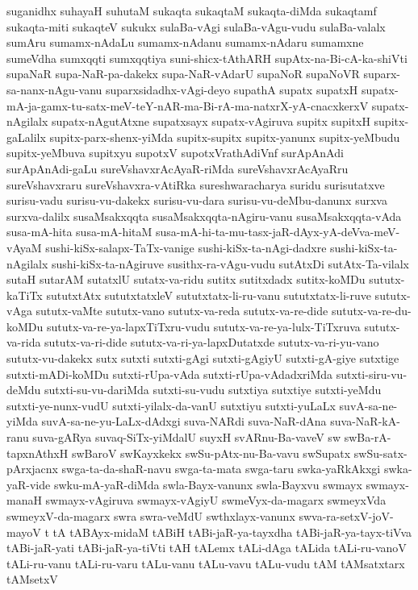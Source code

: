 {suganidhx
suhayaH
suhutaM
sukaqta
sukaqtaM
sukaqta-diMda
sukaqtamf
sukaqta-miti
sukaqteV
sukukx
sulaBa-vAgi
sulaBa-vAgu-vudu
sulaBa-valalx
sumAru
sumamx-nAdaLu
sumamx-nAdanu
sumamx-nAdaru
sumamxne
sumeVdha
sumxqqti
sumxqqtiya
suni-shicx-tAthARH
supAtx-na-Bi-cA-ka-shiVti
supaNaR
supa-NaR-pa-dakekx
supa-NaR-vAdarU
supaNoR
supaNoVR
suparx-sa-nanx-nAgu-vanu
suparxsidadhx-vAgi-deyo
supathA
supatx
supatxH
supatx-mA-ja-gamx-tu-satx-meV-teY-nAR-ma-Bi-rA-ma-natxrX-yA-cnacxkerxV
supatx-nAgilalx
supatx-nAgutAtxne
supatxsayx
supatx-vAgiruva
supitx
supitxH
supitx-gaLalilx
supitx-parx-shenx-yiMda
supitx-supitx
supitx-yanunx
supitx-yeMbudu
supitx-yeMbuva
supitxyu
supotxV
supotxVrathAdiVnf
surApAnAdi
surApAnAdi-gaLu
sureVshavxrAcAyaR-riMda
sureVshavxrAcAyaRru
sureVshavxraru
sureVshavxra-vAtiRka
sureshwaracharya
suridu
surisutatxve
surisu-vadu
surisu-vu-dakekx
surisu-vu-dara
surisu-vu-deMbu-danunx
surxva
surxva-dalilx
susaMsakxqqta
susaMsakxqqta-nAgiru-vanu
susaMsakxqqta-vAda
susa-mA-hita
susa-mA-hitaM
susa-mA-hi-ta-mu-tasx-jaR-dAyx-yA-deVva-meV-vAyaM
sushi-kiSx-salapx-TaTx-vanige
sushi-kiSx-ta-nAgi-dadxre
sushi-kiSx-ta-nAgilalx
sushi-kiSx-ta-nAgiruve
susithx-ra-vAgu-vudu
sutAtxDi
sutAtx-Ta-vilalx
sutaH
sutarAM
sutatxlU
sutatx-va-ridu
sutitx
sutitxdadx
sutitx-koMDu
sututx-kaTiTx
sututxtAtx
sututxtatxleV
sututxtatx-li-ru-vanu
sututxtatx-li-ruve
sututx-vAga
sututx-vaMte
sututx-vano
sututx-va-reda
sututx-va-re-dide
sututx-va-re-du-koMDu
sututx-va-re-ya-lapxTiTxru-vudu
sututx-va-re-ya-lulx-TiTxruva
sututx-va-rida
sututx-va-ri-dide
sututx-va-ri-ya-lapxDutatxde
sututx-va-ri-yu-vano
sututx-vu-dakekx
sutx
sutxti
sutxti-gAgi
sutxti-gAgiyU
sutxti-gA-giye
sutxtige
sutxti-mADi-koMDu
sutxti-rUpa-vAda
sutxti-rUpa-vAdadxriMda
sutxti-siru-vu-deMdu
sutxti-su-vu-dariMda
sutxti-su-vudu
sutxtiya
sutxtiye
sutxti-yeMdu
sutxti-ye-nunx-vudU
sutxti-yilalx-da-vanU
sutxtiyu
sutxti-yuLaLx
suvA-sa-ne-yiMda
suvA-sa-ne-yu-LaLx-dAdxgi
suva-NARdi
suva-NaR-dAna
suva-NaR-kA-ranu
suva-gARya
suvaq-SiTx-yiMdalU
suyxH
svARnu-Ba-vaveV
sw
swBa-rA-tapxnAthxH
swBaroV
swKayxkekx
swSu-pAtx-nu-Ba-vavu
swSupatx
swSu-satx-pArxjacnx
swga-ta-da-shaR-navu
swga-ta-mata
swga-taru
swka-yaRkAkxgi
swka-yaR-vide
swku-mA-yaR-diMda
swla-Bayx-vanunx
swla-Bayxvu
swmayx
swmayx-manaH
swmayx-vAgiruva
swmayx-vAgiyU
swmeVyx-da-magarx
swmeyxVda
swmeyxV-da-magarx
swra
swra-veMdU
swthxlayx-vanunx
swva-ra-setxV-joV-mayoV
t
tA
tABAyx-midaM
tABiH
tABi-jaR-ya-tayxdha
tABi-jaR-ya-tayx-tiVva
tABi-jaR-yati
tABi-jaR-ya-tiVti
tAH
tALemx
tALi-dAga
tALida
tALi-ru-vanoV
tALi-ru-vanu
tALi-ru-varu
tALu-vanu
tALu-vavu
tALu-vudu
tAM
tAMsatxtarx
tAMsetxV
}

